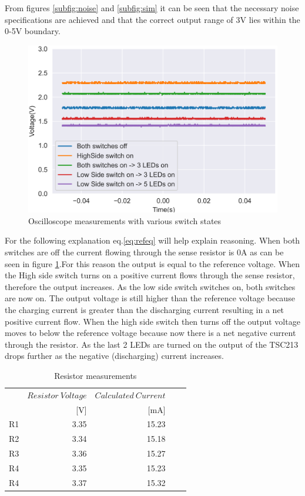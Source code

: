 From figures \ref{subfig:noise} and \ref{subfig:sim} it can be seen that the necessary noise specifications are achieved and that the correct output range of 3V lies within the 0-5V boundary.
\begin{figure}[!htb]
\centering
\includegraphics[scale=0.7]{./Figures/meas.png}
\caption{Oscilloscope measurements with various switch states}
\label{fig:meas}
\end{figure}

For the following explanation eq.\ref{eq:refeq} will help explain reasoning. When both switches are off the current flowing through the sense resistor is 0A as can be seen in figure \ref{fig:meas}.For this reason the output is equal to the reference voltage. When the High side switch turns on a positive current flows through the sense resistor, therefore the output increases. As the low side switch switches on, both switches are now on. The output voltage is still higher than the reference voltage because the charging current is greater than the discharging current resulting in a net positive current flow. When the high side switch then turns off the output voltage moves to below the reference voltage because now there is a net negative current through the resistor. As the last 2 LEDs are turned on the output of the TSC213 drops further as the negative (discharging) current increases.



\begin{table}[!htb]
        \centering
        \footnotesize
        \caption{Resistor measurements}
         \begin{tabular}{lrrrr}
          \toprule
             & $Resistor \ Voltage$ & $Calculated \ Current$ \\
             &  [V]  & [mA]\\
          \midrule
         R1      & 3.35 & 15.23 \\
          R2 & 3.34   & 15.18 \\
          R3       &3.36 & 15.27 \\
          R4        &3.35 & 15.23 \\
          R4        &3.37 &15.32 \\
          \bottomrule
        \end{tabular}
     \label{tab:resistor meas}
\end{table}



